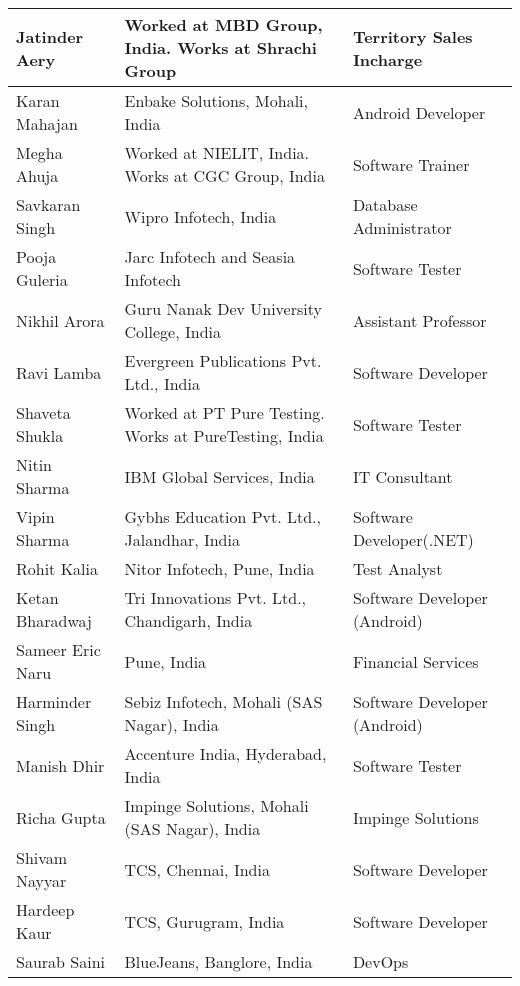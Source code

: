 \documentclass[margin,line]{res}
\begin{document}
\begin{resume}
\begin{center}
\begin{tabular}{ | p{3cm} | p{5.30cm} | l | }
    \hline    
    Jatinder Aery & Worked at MBD Group, India. Works at Shrachi Group & Territory Sales Incharge\\
    \hline    
    Karan Mahajan & Enbake Solutions, Mohali, India & Android Developer\\
    \hline
    Megha Ahuja & Worked at NIELIT, India. Works at CGC Group, India & Software Trainer\\
    \hline
    Savkaran Singh & Wipro Infotech, India & Database Administrator\\
    \hline
    Pooja Guleria & Jarc Infotech and Seasia Infotech & Software Tester\\
    \hline
    Nikhil Arora & Guru Nanak Dev University College, India & Assistant Professor\\
    \hline
    Ravi Lamba & Evergreen Publications Pvt. Ltd., India & Software Developer\\
    \hline
    Shaveta Shukla & Worked at PT Pure Testing. Works at PureTesting, India & Software Tester\\
    \hline 
    Nitin Sharma & IBM Global Services, India & IT Consultant\\
    \hline
    Vipin Sharma & Gybhs Education Pvt. Ltd., Jalandhar, India & Software Developer(.NET)\\
    \hline
    Rohit Kalia & Nitor Infotech, Pune, India & Test Analyst\\
    \hline
    Ketan Bharadwaj & Tri Innovations Pvt. Ltd., Chandigarh, India & Software Developer (Android)\\
    \hline
    Sameer Eric Naru & Pune, India & Financial Services\\
    \hline
    Harminder Singh & Sebiz Infotech, Mohali (SAS Nagar), India & Software Developer (Android)\\
    \hline
    Manish Dhir & Accenture India, Hyderabad, India & Software Tester\\
    \hline
    Richa Gupta & Impinge Solutions,  Mohali (SAS Nagar), India & Impinge Solutions\\
    \hline
    Shivam Nayyar & TCS, Chennai, India & Software Developer\\
    \hline
	Hardeep Kaur & TCS, Gurugram, India & Software Developer\\
	\hline
	Saurab Saini & BlueJeans, Banglore, India & DevOps\\
	\hline
    \end{tabular}

\end{center}

\end{resume}
\end{document}
